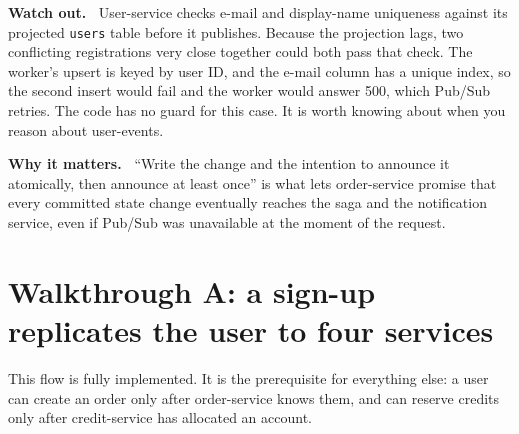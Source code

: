 \documentclass[11pt,a4paper]{article}
\newcommand{\code}[1]{\nolinkurl{#1}}
\newenvironment{why}{%
  \def\FrameCommand{{\color{accent}\vrule width 2.5pt}\hspace{8pt}}%
  \MakeFramed{\advance\hsize-\width\FrameRestore}\noindent\textbf{Why it matters.\ }}%
  {\endMakeFramed}
\newenvironment{caveat}{%
  \def\FrameCommand{{\color{async}\vrule width 2.5pt}\hspace{8pt}}%
  \MakeFramed{\advance\hsize-\width\FrameRestore}\noindent\textbf{Watch out.\ }}%
  {\endMakeFramed}
\begin{document}
\begin{caveat}
User-service checks e-mail and display-name uniqueness against its projected
\code{users} table before it publishes. Because the projection lags, two conflicting
registrations very close together could both pass that check. The worker's upsert is
keyed by user ID, and the e-mail column has a unique index, so the second insert would
fail and the worker would answer 500, which Pub/Sub retries. The code has no guard for
this case. It is worth knowing about when you reason about user-events.
\end{caveat}

\begin{why}
``Write the change and the intention to announce it atomically, then announce at least
once'' is what lets order-service promise that every committed state change eventually
reaches the saga and the notification service, even if Pub/Sub was unavailable at the
moment of the request.
\end{why}

\section{Walkthrough A: a sign-up replicates the user to four services}
\label{sec:signup}

This flow is fully implemented. It is the prerequisite for everything else: a user can
create an order only after order-service knows them, and can reserve credits only after
credit-service has allocated an account.
\end{document}
